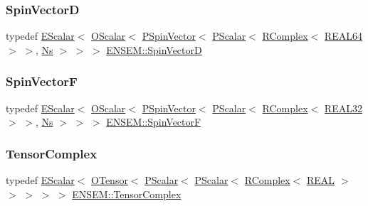 \mbox{\label{group__defs_ga9fdac1b0bfb17e095eb78a356858681b}} 
\subsubsection{\texorpdfstring{SpinVectorD}{SpinVectorD}}
{\footnotesize\ttfamily typedef \mbox{\hyperlink{classENSEM_1_1EScalar}{E\+Scalar}}$<$ \mbox{\hyperlink{classENSEM_1_1OScalar}{O\+Scalar}}$<$ \mbox{\hyperlink{classENSEM_1_1PSpinVector}{P\+Spin\+Vector}}$<$ \mbox{\hyperlink{classENSEM_1_1PScalar}{P\+Scalar}}$<$ \mbox{\hyperlink{classENSEM_1_1RComplex}{R\+Complex}}$<$ \mbox{\hyperlink{namespaceENSEM_a85b215b9f1f43715aebee01718e25082}{R\+E\+A\+L64}} $>$ $>$, \mbox{\hyperlink{namespaceENSEM_a6f05e048f9b2eb1a19131074f8abc25f}{Ns}} $>$ $>$ $>$ \mbox{\hyperlink{group__defs_ga9fdac1b0bfb17e095eb78a356858681b}{E\+N\+S\+E\+M\+::\+Spin\+VectorD}}}

\mbox{\label{group__defs_gac8b2551d6b9e8c0baa2f4261f966b28a}} 
\subsubsection{\texorpdfstring{SpinVectorF}{SpinVectorF}}
{\footnotesize\ttfamily typedef \mbox{\hyperlink{classENSEM_1_1EScalar}{E\+Scalar}}$<$ \mbox{\hyperlink{classENSEM_1_1OScalar}{O\+Scalar}}$<$ \mbox{\hyperlink{classENSEM_1_1PSpinVector}{P\+Spin\+Vector}}$<$ \mbox{\hyperlink{classENSEM_1_1PScalar}{P\+Scalar}}$<$ \mbox{\hyperlink{classENSEM_1_1RComplex}{R\+Complex}}$<$ \mbox{\hyperlink{namespaceENSEM_a7540d01191172323e9073283d772576d}{R\+E\+A\+L32}} $>$ $>$, \mbox{\hyperlink{namespaceENSEM_a6f05e048f9b2eb1a19131074f8abc25f}{Ns}} $>$ $>$ $>$ \mbox{\hyperlink{group__defs_gac8b2551d6b9e8c0baa2f4261f966b28a}{E\+N\+S\+E\+M\+::\+Spin\+VectorF}}}

\mbox{\label{group__defs_gaa7d4b94401ce3fe4074e5133299e9924}} 
\subsubsection{\texorpdfstring{TensorComplex}{TensorComplex}}
{\footnotesize\ttfamily typedef \mbox{\hyperlink{classENSEM_1_1EScalar}{E\+Scalar}}$<$ \mbox{\hyperlink{classENSEM_1_1OTensor}{O\+Tensor}}$<$ \mbox{\hyperlink{classENSEM_1_1PScalar}{P\+Scalar}}$<$ \mbox{\hyperlink{classENSEM_1_1PScalar}{P\+Scalar}}$<$ \mbox{\hyperlink{classENSEM_1_1RComplex}{R\+Complex}}$<$ \mbox{\hyperlink{namespaceENSEM_a6dd9aa6508168f545c861787e63ddd1e}{R\+E\+AL}} $>$ $>$ $>$ $>$ $>$ \mbox{\hyperlink{group__defs_gaa7d4b94401ce3fe4074e5133299e9924}{E\+N\+S\+E\+M\+::\+Tensor\+Complex}}}

